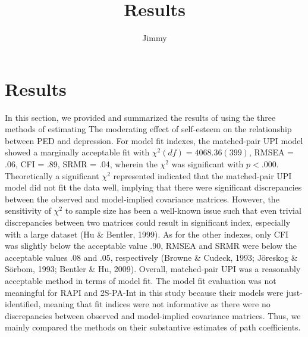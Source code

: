 \documentclass[
  man]{apa7}
\title{Results}
\author{Jimmy\textsuperscript{}}
\date{}
\affiliation{\phantom{0}}
\begin{document}
\maketitle

\hypertarget{results}{%
\section{Results}\label{results}}

In this section, we provided and summarized the results of using the three methods of estimating The moderating effect of self-esteem on the relationship between PED and depression. For model fit indexes, the matched-pair UPI model showed a marginally acceptable fit with \(\chi^2(df) = 4068.36(399)\), RMSEA = .06, CFI = .89, SRMR = .04, wherein the \(\chi^2\) was significant with \(\textit{p} < .000\). Theoretically a significant \(\chi^2\) represented indicated that the matched-pair UPI model did not fit the data well, implying that there were significant discrepancies between the observed and model-implied covariance matrices. However, the sensitivity of \(\chi^2\) to sample size has been a well-known issue such that even trivial discrepancies between two matrices could result in significant index, especially with a large dataset (Hu \& Bentler, 1999). As for the other indexes, only CFI was slightly below the acceptable value .90, RMSEA and SRMR were below the acceptable values .08 and .05, respectively (Browne \& Cudeck, 1993; Jöreskog \& Sörbom, 1993; Bentler \& Hu, 2009). Overall, matched-pair UPI was a reasonably acceptable method in terms of model fit. The model fit evaluation was not meaningful for RAPI and 2S-PA-Int in this study because their models were just-identified, meaning that fit indices were not informative as there were no discrepancies between observed and model-implied covariance matrices. Thus, we mainly compared the methods on their substantive estimates of path coefficients.
\end{document}

